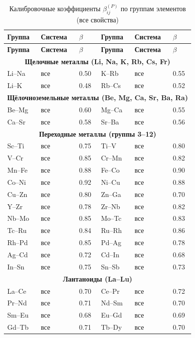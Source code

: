 \documentclass[12pt,a4paper]{article}
\begin{document}
	\begin{longtable}{p{2.5cm} p{2.5cm} p{1.2cm} p{2.5cm} p{2.5cm} p{1.2cm}}
		\caption{Калибровочные коэффициенты $\beta_{ij}^{(P)}$ по группам элементов (все свойства)}\label{tab:beta_group}\\
		\toprule
		\textbf{Группа} & \textbf{Система} & $\beta$ & \textbf{Группа} & \textbf{Система} & $\beta$ \\
		\midrule
		\endfirsthead
		\toprule
		\textbf{Группа} & \textbf{Система} & $\beta$ & \textbf{Группа} & \textbf{Система} & $\beta$ \\
		\midrule
		\endhead
		\multicolumn{6}{c}{\textbf{Щелочные металлы (Li, Na, K, Rb, Cs, Fr)}} \\
		Li–Na & все & 0.50 & K–Rb & все & 0.55 \\
		Li–K  & все & 0.48 & Rb–Cs & все & 0.52 \\
		\multicolumn{6}{c}{\textbf{Щёлочноземельные металлы (Be, Mg, Ca, Sr, Ba, Ra)}} \\
		Be–Mg & все & 0.60 & Mg–Ca & все & 0.55 \\
		Ca–Sr & все & 0.58 & Sr–Ba & все & 0.56 \\
		\multicolumn{6}{c}{\textbf{Переходные металлы (группы 3–12)}} \\
		Sc–Ti & все & 0.75 & Ti–V & все & 0.80 \\
		V–Cr  & все & 0.85 & Cr–Mn & все & 0.82 \\
		Mn–Fe & все & 0.88 & Fe–Co & все & 0.90 \\
		Co–Ni & все & 0.92 & Ni–Cu & все & 0.88 \\
		Cu–Zn & все & 0.80 & Zn–Ga & все & 0.70 \\
		Y–Zr  & все & 0.78 & Zr–Nb & все & 0.82 \\
		Nb–Mo & все & 0.85 & Mo–Tc & все & 0.83 \\
		Tc–Ru & все & 0.84 & Ru–Rh & все & 0.86 \\
		Rh–Pd & все & 0.85 & Pd–Ag & все & 0.78 \\
		Ag–Cd & все & 0.72 & Cd–In & все & 0.68 \\
		In–Sn & все & 0.75 & Sn–Sb & все & 0.73 \\
		\multicolumn{6}{c}{\textbf{Лантаноиды (La–Lu)}} \\
		La–Ce & все & 0.70 & Ce–Pr & все & 0.72 \\
		Pr–Nd & все & 0.71 & Nd–Sm & все & 0.70 \\
		Sm–Eu & все & 0.68 & Eu–Gd & все & 0.69 \\
		Gd–Tb & все & 0.71 & Tb–Dy & все & 0.70 \\

\end{longtable}
\end{document}
